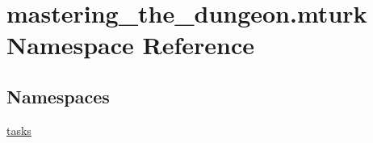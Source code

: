 \hypertarget{namespacemastering__the__dungeon_1_1mturk}{}\section{mastering\+\_\+the\+\_\+dungeon.\+mturk Namespace Reference}
\label{namespacemastering__the__dungeon_1_1mturk}
\subsection*{Namespaces}
\begin{DoxyCompactItemize}
\item 
 \hyperlink{namespacemastering__the__dungeon_1_1mturk_1_1tasks}{tasks}
\end{DoxyCompactItemize}
